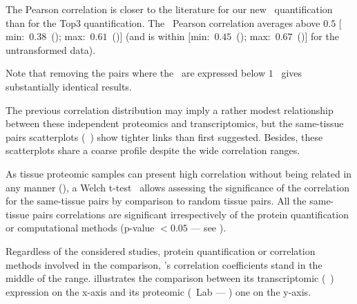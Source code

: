 The Pearson correlation is closer to the literature
for our new \PPKM\ quantification
than for the Top3 quantification.
The \PPKM\ Pearson correlation averages
above $0.5$ $[$min:~$0.38$~(\Oesophagus)\;; max:~$0.61$~(\Liver)$]$
(and is within $[$min:~$0.45$~(\Oesophagus)\;; max:~$0.67$~(\Liver)$]$
for the untransformed data).\\
\vspace{-\baselineskip}

Note that removing the pairs where the \mRNAs\ are expressed below $1$ \FPKM\
gives substantially identical results.

The previous correlation distribution
may imply a rather modest relationship between
these independent proteomics and transcriptomics,
but the same-tissue pairs scatterplots (\eg\ )
show tighter links than first suggested.
Besides, these scatterplots share a coarse profile
despite the wide correlation ranges.\\
\vspace{-\baselineskip}

As tissue proteomic samples can present high correlation
without being related in any manner
(),
a Welch t-test~ allows
assessing the significance of the correlation for the same-tissue pairs
by comparison to random tissue pairs.
All the same-tissue pairs correlations are significant
irrespectively of the protein quantification or computational methods
(p-value $<0.05$ --- see \Cref{tab:pvalueCorrSP}).%

Regardless of the considered studies,
protein quantification or correlation methods involved in the comparison,
\kidney's correlation coefficients stand in the middle of the range.
\Cref{fig:ScatKid} illustrates the comparison
between its transcriptomic (\uhlen\ \etal) expression on the x-axis
and its proteomic (\pandey\ Lab --- \PPKM) one on the y-axis.


